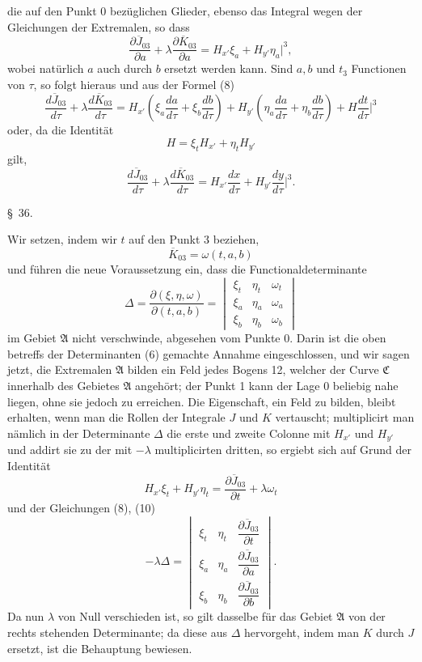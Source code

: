 \documentclass[11pt,a4paper,leqno]{article}
\begin{document}
die auf den Punkt 0 bezüglichen Glieder, ebenso das Integral wegen der Gleichungen der Extremalen, so dass
\begin{equation}\tag{10}
\frac{\partial\overline{J}_{03}}{\partial a}+\lambda\frac{\partial\overline{K}_{03}}{\partial a}
=H_{x'}\xi_a+H_{y'}\eta_a\bigg|^3,
\end{equation}
wobei natürlich $a$ auch durch $b$ ersetzt werden kann. Sind $a,b$ und $t_3$ Functionen von $\tau$, so folgt hieraus und aus der Formel (8)
\[
\frac{d\overline{J}_{03}}{d\tau}+\lambda\frac{d\overline{K}_{03}}{d\tau}
=H_{x'}\left(\xi_a\frac{da}{d\tau}+\xi_b\frac{db}{d\tau}\right)
+H_{y'}\left(\eta_a\frac{da}{d\tau}+\eta_b\frac{db}{d\tau}\right)+H\frac{dt}{d\tau}\bigg|^3
\]
oder, da die Identität
\[
H=\xi_tH_{x'}+\eta_tH_{y'}
\]
gilt,
\begin{equation}\tag{11}
\frac{d\overline{J}_{03}}{d\tau}+\lambda\frac{d\overline{K}_{03}}{d\tau}
=H_{x'}\frac{dx}{d\tau}+H_{y'}\frac{dy}{d\tau}\bigg|^3.
\end{equation}

\begin{center}{\large \S~36.}\end{center}

Wir setzen, indem wir $t$ auf den Punkt 3 beziehen,
\[
\overline{K}_{03}=\omega(t,a,b)
\]
und führen die neue Voraussetzung ein, dass die Functionaldeterminante
\begingroup
\setlength{\arraycolsep}{1pt}
\[
\Delta=\frac{\partial(\xi,\eta,\omega)}{\partial(t,a,b)}=
\begin{vmatrix}
\xi_t&\eta_t&\omega_t\\
\xi_a&\eta_a&\omega_a\\
\xi_b&\eta_b&\omega_b
\end{vmatrix}
\]
im Gebiet $\mathfrak{A}$ nicht verschwinde, abgesehen vom Punkte 0. Darin ist die oben betreffs der Determinanten (6) gemachte Annahme eingeschlossen, und wir sagen jetzt, die Extremalen $\mathfrak{A}$ bilden ein Feld jedes Bogens 12, welcher der Curve $\mathfrak{C}$ innerhalb des Gebietes $\mathfrak{A}$ angehört; der Punkt 1 kann der Lage 0 beliebig nahe liegen, ohne sie jedoch zu erreichen. Die Eigenschaft, ein Feld zu bilden, bleibt erhalten, wenn man die Rollen der Integrale $J$ und $K$ vertauscht; multiplicirt man nämlich in der Determinante $\Delta$ die erste und zweite Colonne mit $H_{x'}$ und $H_{y'}$ und addirt sie zu der mit $-\lambda$ multiplicirten dritten, so ergiebt sich auf Grund der Identität
\[
H_{x'}\xi_t+H_{y'}\eta_t=\frac{\partial\overline{J}_{03}}{\partial t}+\lambda\omega_t
\]
und der Gleichungen (8), (10)
\[
-\lambda\Delta=
\begin{vmatrix}
\xi_t&\eta_t&\dfrac{\partial\overline{J}_{03}}{\partial t}\\[1.2ex]
\xi_a&\eta_a&\dfrac{\partial\overline{J}_{03}}{\partial a}\\[1.2ex]
\xi_b&\eta_b&\dfrac{\partial\overline{J}_{03}}{\partial b}
\end{vmatrix}.
\]
\endgroup
Da nun $\lambda$ von Null verschieden ist, so gilt dasselbe für das Gebiet $\mathfrak{A}$ von der rechts stehenden Determinante; da diese aus $\Delta$ hervorgeht, indem man $K$ durch $J$ ersetzt, ist die Behauptung bewiesen.
\end{document}
